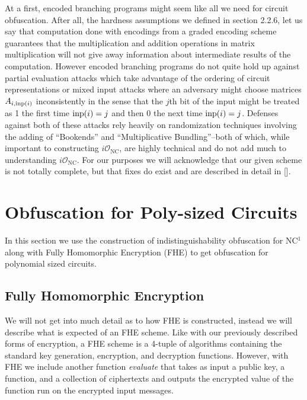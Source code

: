 \documentclass[12pt,twoside]{reedthesis}
\begin{document}
    \par At a first, encoded branching programs might seem like all we need for circuit obfuscation. After all, the hardness assumptions we defined in section 2.2.6, let us say that computation done with encodings from a graded encoding scheme guarantees that the multiplication and addition operations in matrix multiplication will not give away information about intermediate results of the computation. However encoded branching programs do not quite hold up against partial evaluation attacks which take advantage of the ordering of circuit representations or mixed input attacks where an adversary might choose matrices $A_{i,\text{inp}(i)}$ inconsistently in the sense that the $j$th bit of the input might be treated as 1 the first time $\text{inp}(i)=j$ and then 0 the next time $\text{inp}(i) = j$. Defenses against both of these attacks rely heavily on randomization techniques involving the adding of ``Bookends'' and ``Multiplicative Bundling''--both of which, while important to constructing $i\mathcal{O}_\text{NC}$, are highly technical and do not add much to understanding $i\mathcal{O}_\text{NC}$. For our purposes we will acknowledge that our given scheme is not totally complete, but that fixes do exist and are described in detail in [\cite{Garg:2013}].
    
    
   
     
   
    
    \section{Obfuscation for Poly-sized Circuits}
    In this section we use the construction of indistinguishability obfuscation for NC$^1$ along with Fully Homomorphic Encryption (FHE) to get obfuscation for polynomial sized circuits.
    
    \subsection{Fully Homomorphic Encryption}
    We will not get into much detail as to how FHE is constructed, instead we will describe what is expected of an FHE scheme. Like with our previously described forms of encryption, a FHE scheme is a 4-tuple of algorithms containing the standard key generation, encryption, and decryption functions. However, with FHE we include another function \textit{evaluate} that takes as input a public key, a function, and a collection of ciphertexts and outputs the encrypted value of the function run on the encrypted input messages. 
    
\end{document}
